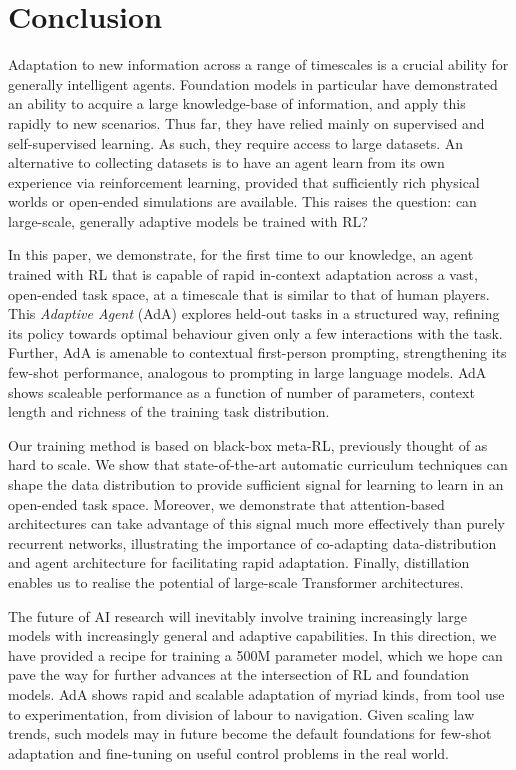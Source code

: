 \section{Conclusion}  

Adaptation to new information across a range of timescales is a crucial ability for generally intelligent agents. Foundation models in particular have demonstrated an ability to acquire a large knowledge-base of information, and apply this rapidly to new scenarios. Thus far, they have relied mainly on supervised and self-supervised learning. As such, they require access to large datasets. An alternative to collecting datasets is to have an agent learn from its own experience via reinforcement learning, provided that sufficiently rich physical worlds or open-ended simulations are available. This raises the question: can large-scale, generally adaptive models be trained with RL?

In this paper, we demonstrate, for the first time to our knowledge, an agent trained with RL that is capable of rapid in-context adaptation across a vast, open-ended task space, at a timescale that is similar to that of human players. This \textit{Adaptive Agent} (AdA) explores held-out tasks in a structured way, refining its policy towards optimal behaviour given only a few interactions with the task. Further, AdA is amenable to contextual first-person prompting, strengthening its few-shot performance, analogous to prompting in large language models. AdA shows scaleable performance as a function of number of parameters, context length and richness of the training task distribution. 

Our training method is based on black-box meta-RL, previously thought of as hard to scale. We show that state-of-the-art automatic curriculum techniques can shape the data distribution to provide sufficient signal for learning to learn in an open-ended task space. Moreover, we demonstrate that attention-based architectures can take advantage of this signal much more effectively than purely recurrent networks, illustrating the importance of co-adapting data-distribution and agent architecture for facilitating rapid adaptation. Finally, distillation enables us to realise the potential of large-scale Transformer architectures. 

The future of AI research will inevitably involve training increasingly large models with increasingly general and adaptive capabilities. In this direction, we have provided a recipe for training a 500M parameter model, which we hope can pave the way for further advances at the intersection of RL and foundation models. AdA shows rapid and scalable adaptation of myriad kinds, from tool use to experimentation, from division of labour to navigation. Given scaling law trends, such models may in future become the default foundations for few-shot adaptation and fine-tuning on useful control problems in the real world.